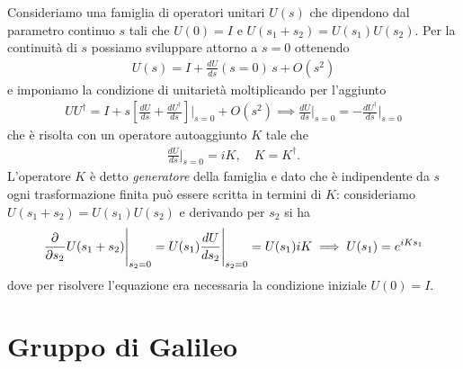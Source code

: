 Consideriamo una famiglia di operatori unitari $ U(s) $ che dipendono dal parametro continuo $ s $ tali che $ U(0) = I $ e $ U(s_1 + s_2) = U(s_1) U(s_2) $.
Per la continuità di $ s $ possiamo sviluppare attorno a $ s = 0 $ ottenendo
\begin{align*}
  U(s) = I + \frac{dU}{ds}(s = 0) \, s + O(s^2)
\end{align*}
e imponiamo la condizione di unitarietà moltiplicando per l'aggiunto 
\begin{align*}
  U U^\dag = I + s \left[ \frac{dU}{ds} + \frac{dU^\dag}{ds} \right] \Bigg\vert_{s = 0} + O(s^2) 
  \implies \frac{dU}{ds} \Bigg\vert_{s = 0} = - \frac{dU^\dag}{ds} \Bigg\vert_{s = 0}
\end{align*}
che è risolta con un operatore autoaggiunto $ K $ tale che 
\begin{align*}
  \frac{dU}{ds} \Bigg\vert_{s = 0} = i K, \quad K = K^\dag.
\end{align*}
L'operatore $ K $ è detto \textit{generatore} della famiglia e dato che è indipendente da $ s $ ogni trasformazione finita può essere scritta in termini di 
$ K $: consideriamo $ U(s_1 + s_2) = U(s_1) U(s_2) $ e derivando per $ s_2 $ si ha
\begin{align*}
  \frac{\partial^{} {}}{\partial {s_2}^{}} U(s_1 + s_2) \Bigg\vert_{s_2 = 0} = U(s_1) \frac{dU}{ds_2}\Bigg\vert_{s_2 = 0} = U(s_1) iK \implies U(s_1) = e^{iKs_1}
\end{align*}
dove per risolvere l'equazione era necessaria la condizione iniziale $ U(0) = I $.

\section{Gruppo di Galileo}

